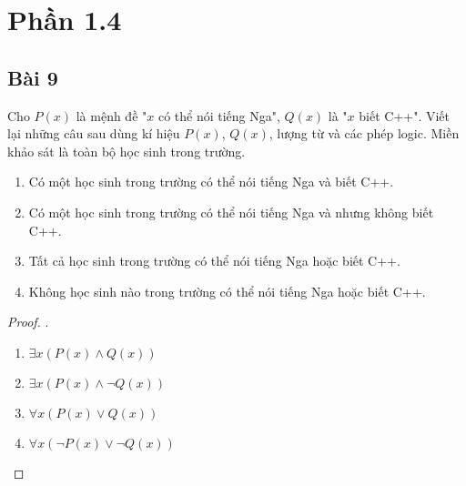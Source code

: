 \section*{Phần 1.4}
\subsection*{Bài 9}
Cho $P(x)$ là mệnh đề "$x$ có thể nói tiếng Nga", $Q(x)$ là "$x$ biết C++". Viết lại những câu sau dùng kí hiệu $P(x)$, $Q(x)$, lượng từ và các phép logic. Miền khảo sát là toàn bộ học sinh trong trường.
\begin{enumerate}[label=\alph*)]
    \item Có một học sinh trong trường có thể nói tiếng Nga và biết C++.
    \item Có một học sinh trong trường có thể nói tiếng Nga và nhưng không biết C++.
    \item Tất cả học sinh trong trường có thể nói tiếng Nga hoặc biết C++.
    \item Không học sinh nào trong trường có thể nói tiếng Nga hoặc biết C++.
\end{enumerate}
\begin{proof}.
    \begin{multicols}{2}
        \begin{enumerate}[label=\alph*)]
            \item $\exists x(P(x)\land Q(x))$
            \item $\exists x(P(x)\land\neg Q(x))$
            \item $\forall x(P(x)\lor Q(x))$
            \item $\forall x(\neg P(x)\lor \neg Q(x))$
        \end{enumerate}
    \end{multicols}
\end{proof}
